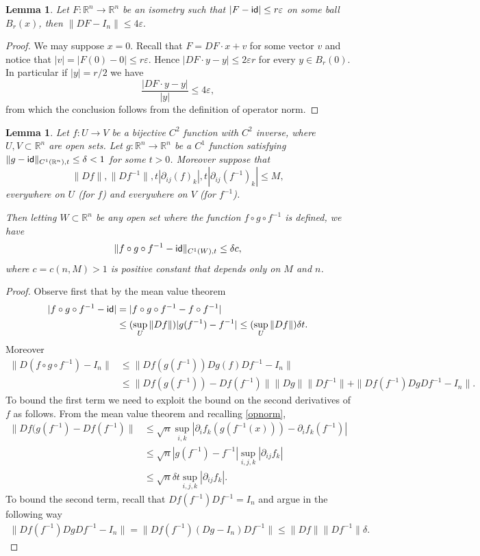 \documentclass[11pt]{article}
\newcommand{\eps}{\varepsilon}
\newcommand{\rr}{\mathbb{R}}
\theoremstyle{plain}
\newtheorem{lemma}[theorem]{Lemma}
\theoremstyle{definition}
\numberwithin{equation}{section}
\begin{document}
\begin{lemma}\label{isombound}
	Let $F : \rr^n \to \rr^n$ be an isometry such that $|F-{\sf{id}}|\le r \eps $ on some ball $B_{r}(x)$, then $\|DF-I_n\|\le 4\eps.$ 
\end{lemma}
\begin{proof}
	We may suppose $x=0.$ Recall that $F=DF\cdot x+v$ for some vector $v$ and notice that $|v|=|F(0)-0|\le r \eps$. Hence $|DF \cdot y-y|\le 2 \eps r$ for every $y \in B_r(0)$. In particular if $|y|=r/2$ we have
	\[ \frac{|DF \cdot y-y|}{|y|}\le 4 \eps,\]
from which the conclusion  follows from the definition of operator norm.
\end{proof}


\begin{lemma}\label{B4}
	Let $f:   U \to V$ be a bijective $C^2$ function  with $C^2$ inverse, where $U,V\subset \rr^n$ are open sets.  Let $g: \rr^n \to \rr^n$ be a $C^1$ function satisfying $\|g-{\sf{id}}\|_{C^1(\rr^n),t}\le \delta<1$ for some $t>0$. Moreover suppose that 
	\[\|Df\|,\|Df^{-1}\|,t|\partial_{ij}(f)_k|,t|\partial_{ij}(f^{-1})_k|\le M, \]
	everywhere on $U$ (for $f$) and everywhere on $V$ (for $f^{-1}$).
	
	Then letting $W\subset \rr^n$ be any open set where the function $f\circ g \circ f^{-1}$ is defined, we have
	\[ \|f\circ g \circ f^{-1}-{\sf{id}}\|_{C^1(W),t} \le \delta c, \]
	where $c=c(n,M)>1$ is positive constant that depends only on $M$ and $n$.
\end{lemma}
\begin{proof}
	Observe first that by the mean value theorem
	\begin{align*}
		|f\circ g \circ f^{-1}-{\sf{id}}|&=|f\circ g \circ f^{-1}-f\circ f^{-1}|\\
		&\le (\sup_U \|Df\|)|g(f^{-1})-f^{-1}|\le(\sup_U \|Df\|)\delta t.
	\end{align*}
	Moreover 
	\begin{align*}
		\|D(f\circ g \circ f^{-1})-I_n\|&\le\|Df(g(f^{-1}))Dg(f)Df^{-1}-I_n\|\\
		&\le \|Df(g(f^{-1}))-Df(f^{-1})\|\|Dg\|\|Df^{-1}\|+\|Df(f^{-1})DgDf^{-1}-I_n\|.
	\end{align*}
	To bound the first term we need to exploit the bound on the second derivatives of $f$ as follows. From the mean value theorem and recalling \eqref{opnorm},
	\begin{align*} 
		\|Df(g(f^{-1})-Df(f^{-1})\| &\le \sqrt n\sup_{i,k} |\partial_i f_k(g(f^{-1}(x)))-\partial_i f_k(f^{-1})|\\
		&\le  \sqrt n  |g(f^{-1})-f^{-1}| \sup_{i,j,k}|\partial_{ij}f_k|\\
		&\le  \sqrt n \delta t\sup_{i,j,k}|\partial_{ij}f_k|.
	\end{align*}
	To bound the second term, recall that $Df(f^{-1})Df^{-1}=I_n$ and argue in the following way
	\begin{align*}
		\|Df(f^{-1})DgDf^{-1}-I_n\| = \|Df(f^{-1})(Dg-I_n)Df^{-1}\|\le \|Df\|\|Df^{-1}\|\delta.
	\end{align*}
\end{proof}
\end{document}
